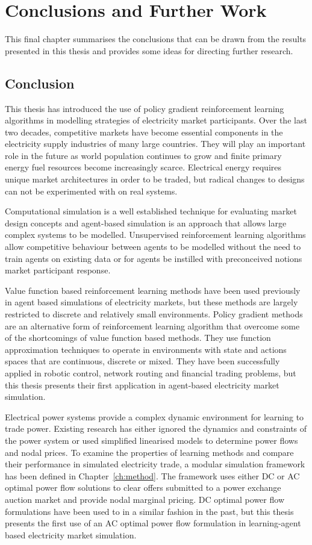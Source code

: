 \chapter{Conclusions and Further Work}
\label{ch:conclusion}
This final chapter summarises the conclusions that can be drawn from the
results presented in this thesis and provides some ideas for directing further
research.

\section{Conclusion}
This thesis has introduced the use of policy gradient reinforcement learning
algorithms in modelling strategies of electricity market participants. Over
the last two decades, competitive markets have become essential components in
the electricity supply industries of many large countries.  They will play an
important role in the future as world population continues to grow and
finite primary energy fuel resources become increasingly scarce.  Electrical
energy requires unique market architectures in order to be traded, but radical
changes to designs can not be experimented with on real systems.

Computational simulation is a well established technique for evaluating market
design concepts and agent-based simulation is an approach that allows large
complex systems to be modelled.  Unsupervised reinforcement learning algorithms
allow competitive behaviour between agents to be modelled without the need to
train agents on existing data or for agents be instilled with preconceived
notions market participant response.

Value function based reinforcement learning methods have been used previously in
agent based simulations of electricity markets, but these methods are largely
restricted to discrete and relatively small environments.  Policy gradient
methods are an alternative form of reinforcement learning algorithm that
overcome some of the shortcomings of value function based methods. They use
function approximation techniques to operate in environments with state and
actions spaces that are continuous, discrete or mixed.  They have been
successfully applied in robotic control, network routing and financial trading
problems, but this thesis presents their first application in agent-based
electricity market simulation.

Electrical power systems provide a complex dynamic environment for learning to
trade power.  Existing research has either ignored the dynamics and constraints
of the power system or used simplified linearised models to determine power
flows and nodal prices.  To examine the properties of learning methods and
compare their performance in simulated electricity trade, a modular simulation
framework has been defined in Chapter~\ref{ch:method}.  The framework uses
either DC or AC optimal power flow solutions to clear offers submitted to a power exchange
auction market and provide nodal marginal pricing. DC optimal power flow
formulations have been used to in a similar fashion in the past, but this thesis
presents the first use of an AC optimal power flow formulation in learning-agent
based electricity market simulation.

